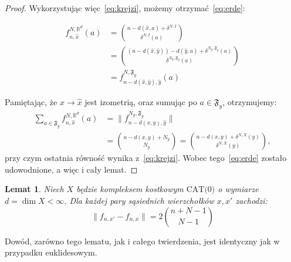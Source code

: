 \documentclass[licencjacka]{pracamgr}
\theoremstyle{definition}
\theoremstyle{definition}
\theoremstyle{definition}
\theoremstyle{definition}
\theoremstyle{definition}
\theoremstyle{plain}
\newtheorem{lemma}{Lemat}[section]
\theoremstyle{plain}
\begin{document}
\begin{proof}
	Wykorzystując więc~\ref{eq:krejzi}, możemy otrzymać~\ref{eq:erde}:

	\begin{align*} 
	f_{n, \hat x}^{N, \mathbb{R}^d} (a) & = {n - d(\hat x, a) + \delta^{N,I} \choose \delta^{N,I}
	(a)} \\
	& = {(n - d(\hat x, \hat y)) - d(\hat y, a) + \delta^{N_y, \mathfrak{F}_y} (a) \choose 
	\delta^{N_y, \mathfrak{F}_y}(a)} \\
	& = f_{n - d(\hat x, \hat y), \hat y}^{N, \mathfrak{F}_y} (a)
	\end{align*}

	Pamiętając, że  $ x \rightarrow \hat x$ jest izometrią, oraz sumując po $ a \in 
	\mathfrak{F}_y $, otrzymujemy:
	\begin{align*}
	\sum\limits_{a \in \mathfrak{F}_y} f_{n,\hat x}^{N, \mathbb{R}^d}(a) &= 
	\|f_{n - d(x,y), \hat y}^{N_y, \mathfrak{F}_y}\| \\
	& = {n - d(x,y) + N_y \choose N_y} = {n - d(x,y) + \delta^{N,X}(y) \choose \delta^{N,X}(y)},
	\end{align*}
	przy czym ostatnia równość wynika z~\ref{eq:krejzi}. Wobec tego~\ref{eq:erde} zostało 
	udowodnione, a więc i cały lemat.
\end{proof}
\begin{lemma}
	Niech $ X $ będzie kompleksem kostkowym $ \text{CAT(0)} $ o wymiarze $ d = \dim X < \infty $.
	Dla każdej pary sąsiednich wierzchołków $ x,x' $ zachodzi:
	$$ \| f_{n,x'} - f_{n,x}\| = 2 {n + N - 1 \choose N - 1} $$
\end{lemma}
Dowód, zarówno tego lematu, jak i całego twierdzenia, 
jest identyczny jak w przypadku euklidesowym.
\end{document}
